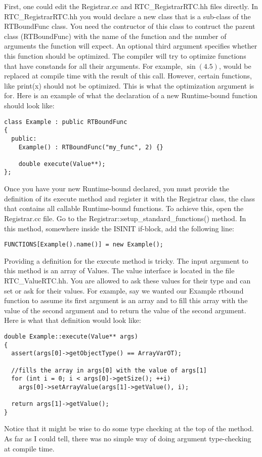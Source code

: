 \documentclass{article}
\begin{document}
\noindent
First, one could edit the Registrar.cc and RTC\_RegistrarRTC.hh files
directly. In RTC\_RegistrarRTC.hh you would declare a new class that is a
sub-class of the RTBoundFunc class. You need the contructor of this class
to contruct the parent class (RTBoundFunc) with the name of the function
and the number of arguments the function will expect. An optional third
argument specifies whether this function should be optimized. The compiler
will try to optimize functions that have constands for all their arguments.
For example, $\sin(4.5)$, would be replaced at compile time with the result
of this call. However, certain functions, like print(x) should not be
optimized. This is what the optimization argument is for. Here is an example
of what the declaration of a new Runtime-bound function should look like:
{\ttfamily \begin{verbatim}
class Example : public RTBoundFunc
{
  public:
    Example() : RTBoundFunc("my_func", 2) {}

    double execute(Value**);
};
\end{verbatim} }
\noindent
Once you have your new Runtime-bound declared, you must provide the definition
of its execute method and register it with the Registrar class, the class that
contains all callable Runtime-bound functions. To achieve this, open the
Registrar.cc file. Go to the Registrar::setup\_standard\_functions() method.
In this method, somewhere inside the ISINIT if-block, add the following
line:
{\ttfamily \begin{verbatim}
FUNCTIONS[Example().name()] = new Example();
\end{verbatim} }
\noindent
Providing a definition for the execute method is tricky. The input argument
to this method is an array of Values. The value interface is located in
the file RTC\_ValueRTC.hh. You are allowed to ask these values for their type
and can set or ask for their values. For example, say we wanted our Example
rtbound function to assume its first argument is an array and to fill this
array with the value of the second argument and to return the value of the
second argument. Here is what that definition would look like:
{\ttfamily \begin{verbatim}
double Example::execute(Value** args)
{
  assert(args[0]->getObjectType() == ArrayVarOT);

  //fills the array in args[0] with the value of args[1]
  for (int i = 0; i < args[0]->getSize(); ++i)
    args[0]->setArrayValue(args[1]->getValue(), i);

  return args[1]->getValue();
}
\end{verbatim} }
\noindent
Notice that it might be wise to do some type checking at the top of the
method. As far as I could tell, there was no simple way of doing argument
type-checking at compile time. \\
\end{document}
